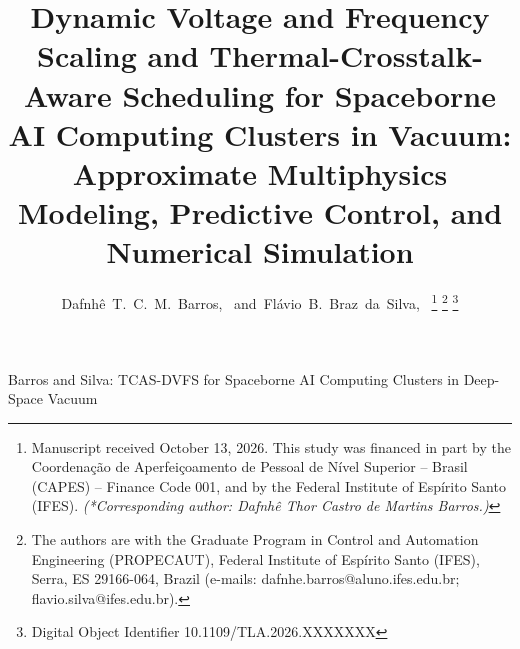 \documentclass[journal]{IEEEtran}
\begin{document}
\title{Dynamic Voltage and Frequency Scaling and Thermal-Crosstalk-Aware Scheduling for Spaceborne AI Computing Clusters in Vacuum:\\ Approximate Multiphysics Modeling, Predictive Control, and Numerical Simulation}

\author{Dafnh\^e~T.~C.~M.~Barros,~
        and~Fl\'avio~B.~Braz~da~Silva,~%
\thanks{Manuscript received October 13, 2026. This study was financed in part by the Coordena\c{c}\~ao de Aperfei\c{c}oamento de Pessoal de N\'ivel Superior -- Brasil (CAPES) -- Finance Code 001, and by the Federal Institute of Esp\'irito Santo (IFES). \textit{(*Corresponding author: Dafnh\^e Thor Castro de Martins Barros.)}}%
\thanks{The authors are with the Graduate Program in Control and Automation Engineering (PROPECAUT), Federal Institute of Esp\'irito Santo (IFES), Serra, ES 29166-064, Brazil (e-mails: dafnhe.barros@aluno.ifes.edu.br; flavio.silva@ifes.edu.br).}%
\thanks{Digital Object Identifier 10.1109/TLA.2026.XXXXXXX}%
}

%
{Barros and Silva: TCAS-DVFS for Spaceborne AI Computing Clusters in Deep-Space Vacuum}

\maketitle
\end{document}
